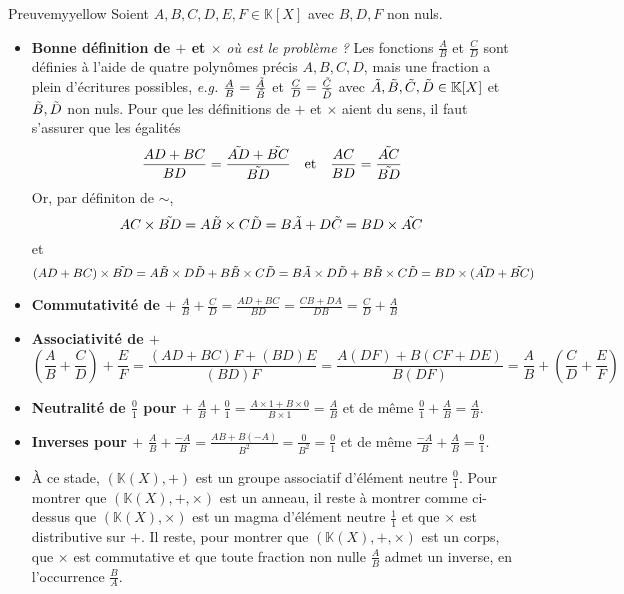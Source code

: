    \begin{demo}{Preuve}{myyellow}
        Soient $A,B,C,D,E,F \in \mathbb{K}[X]$ avec $B,D,F$ non nuls.
        \begin{itemize}[label=\textcolor{myyellow}{$\star$}]
            \item \textbf{Bonne définition de $+$ et $\times$} \quad \textit{où est le problème ?} \quad Les fonctions $\frac{A}{B}$ et $\frac{C}{D}$ sont définies à l’aide de quatre polynômes précis $A,B,C,D$, mais une fraction a plein d’écritures possibles, \textit{e.g.} $\frac{A}{B} = \frac{\Tilde{A}}{\Tilde{B}}$ et $\frac{C}{D} = \frac{\Tilde{C}}{\Tilde{D}}$ avec $\Tilde{A},\Tilde{B},\Tilde{C},\Tilde{D} \in \mathbb{K}[X]$ et $\Tilde{B}, \Tilde{D}$ non nuls. Pour que les définitions de $+$ et $\times$ aient du sens, il faut s’assurer que les égalités 
            \[ \frac{AD + BC}{BD} = \frac{\Tilde{AD} + \Tilde{BC}}{\Tilde{BD}} \quad \text{et} \quad \frac{AC}{BD} = \frac{\Tilde{AC}}{\Tilde{BD}} \]   
            Or, par définiton de $\sim$, 
            \[ AC \times \Tilde{BD} = A \Tilde{B} \times C \Tilde{D} = B \Tilde{A} + D \Tilde{C} = BD \times \Tilde{AC} \]   
            et 
            \[ (AD + BC) \times \Tilde{BD} = A \Tilde{B} \times D \Tilde{D} + B \Tilde{B} \times C \Tilde{D} = B \Tilde{A} \times D \Tilde{D} + B \Tilde{B} \times C \Tilde{D} = BD \times ( \Tilde{AD} + \Tilde{BC}) \]
            \item \textbf{Commutativité de $+$} \quad $\frac{A}{B} + \frac{C}{D} = \frac{AD + BC}{BD} = \frac{CB + DA}{DB} = \frac{C}{D} + \frac{A}{B}$
            \item \textbf{Associativité de $+$} \quad 
            \[ \left(\frac{A}{B} + \frac{C}{D}\right) + \frac{E}{F} = \frac{(AD + BC)F + (BD)E}{(BD)F} = \frac{A(DF) + B(CF + DE)}{B(DF)} = \frac{A}{B} + \left(\frac{C}{D} + \frac{E}{F}\right) \]
            \item \textbf{Neutralité de $\frac{0}{1}$ pour $+$} \quad $\frac{A}{B} + \frac{0}{1} = \frac{A \times 1 + B \times 0}{B \times 1} = \frac{A}{B}$ et de même $\frac{0}{1} + \frac{A}{B} = \frac{A}{B}$.
            \item \textbf{Inverses pour $+$} \quad $\frac{A}{B} + \frac{-A}{B} = \frac{AB + B(-A)}{B^2} = \frac{0}{B^2} = \frac{0}{1}$ et de même $\frac{-A}{B} + \frac{A}{B} = \frac{0}{1}$.
            \item À ce stade, $\left(\mathbb{K}(X), +\right)$ est un groupe associatif d’élément neutre $\frac{0}{1}$. Pour montrer que $\left(\mathbb{K}(X), +, \times\right)$ est un anneau, il reste à montrer comme ci-dessus que $\left(\mathbb{K}(X), \times\right)$ est un magma d’élément neutre $\frac{1}{1}$ et que $\times$ est distributive sur $+$. Il reste, pour montrer que $\left(\mathbb{K}(X), +, \times\right)$ est un corps, que $\times$ est commutative et que toute fraction non nulle $\frac{A}{B}$ admet un inverse, en l’occurrence $\frac{B}{A}$.
        \end{itemize}
    \end{demo}

